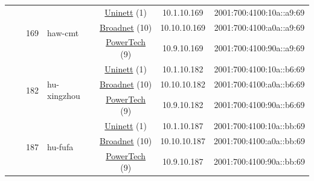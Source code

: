\begin{small}
\begin{center}
\begin{longtable}{|c|c|c|c|c|c|c|c|}
  &  & \multirow{3}{*}{\tiny{169}} & \multicolumn{1}{|l|}{\multirow{3}{*}{\tiny{haw-cmt}}} & \multicolumn{2}{|c|}{\tiny{\href{https://www.uninett.no}{Uninett} (1)}} & \tiny{10.1.10.169} & \tiny{2001:700:4100:10a::a9:69} \\* \cline{5-5}\cline{6-6}\cline{7-7}\cline{8-8}
  &  &  &  & \multicolumn{2}{|c|}{\tiny{\href{https://www.broadnet.no}{Broadnet} (10)}} & \tiny{10.10.10.169} & \tiny{2001:700:4100:a0a::a9:69} \\* \cline{5-5}\cline{6-6}\cline{7-7}\cline{8-8}
  &  &  &  & \multicolumn{2}{|c|}{\tiny{\href{http://www.powertech.no}{PowerTech} (9)}} & \tiny{10.9.10.169} & \tiny{2001:700:4100:90a::a9:69} \\* \cline{3-3}\cline{4-4}\cline{5-5}\cline{6-6}\cline{7-7}\cline{8-8}
  &  & \multirow{3}{*}{\tiny{182}} & \multicolumn{1}{|l|}{\multirow{3}{*}{\tiny{hu-xingzhou}}} & \multicolumn{2}{|c|}{\tiny{\href{https://www.uninett.no}{Uninett} (1)}} & \tiny{10.1.10.182} & \tiny{2001:700:4100:10a::b6:69} \\* \cline{5-5}\cline{6-6}\cline{7-7}\cline{8-8}
  &  &  &  & \multicolumn{2}{|c|}{\tiny{\href{https://www.broadnet.no}{Broadnet} (10)}} & \tiny{10.10.10.182} & \tiny{2001:700:4100:a0a::b6:69} \\* \cline{5-5}\cline{6-6}\cline{7-7}\cline{8-8}
  &  &  &  & \multicolumn{2}{|c|}{\tiny{\href{http://www.powertech.no}{PowerTech} (9)}} & \tiny{10.9.10.182} & \tiny{2001:700:4100:90a::b6:69} \\* \cline{3-3}\cline{4-4}\cline{5-5}\cline{6-6}\cline{7-7}\cline{8-8}
  &  & \multirow{3}{*}{\tiny{187}} & \multicolumn{1}{|l|}{\multirow{3}{*}{\tiny{hu-fufa}}} & \multicolumn{2}{|c|}{\tiny{\href{https://www.uninett.no}{Uninett} (1)}} & \tiny{10.1.10.187} & \tiny{2001:700:4100:10a::bb:69} \\* \cline{5-5}\cline{6-6}\cline{7-7}\cline{8-8}
  &  &  &  & \multicolumn{2}{|c|}{\tiny{\href{https://www.broadnet.no}{Broadnet} (10)}} & \tiny{10.10.10.187} & \tiny{2001:700:4100:a0a::bb:69} \\* \cline{5-5}\cline{6-6}\cline{7-7}\cline{8-8}
  &  &  &  & \multicolumn{2}{|c|}{\tiny{\href{http://www.powertech.no}{PowerTech} (9)}} & \tiny{10.9.10.187} & \tiny{2001:700:4100:90a::bb:69} \\ \hline
\end{longtable}
\end{center}
\end{small}



